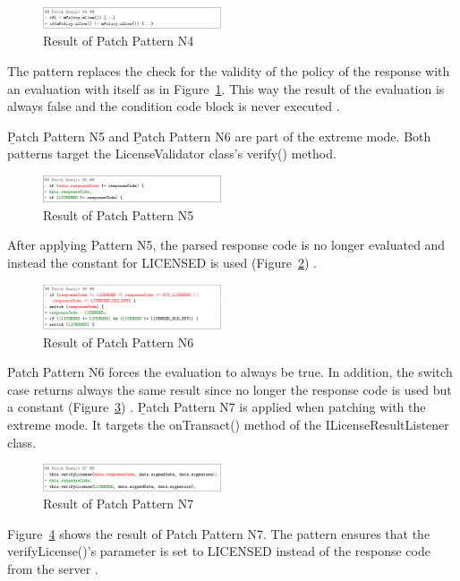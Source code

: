 \documentclass{sig-alternate}
\begin{document}
\begin{figure}[htbp]
  \centering
  \includegraphics[width=0.47\textwidth]{n4.png}
  \caption{Result of Patch Pattern N4 \cite{neutze}}
  \label{n4}
\end{figure}
The pattern replaces the check for the validity of the policy of the response with an evaluation with itself as in Figure~\ref{n4}.
This way the result of the evaluation is always false and the condition code block is never executed \cite{neutze}.

\b{Patch Pattern N5} and \b{Patch Pattern N6} are part of the extreme mode.
Both patterns target the LicenseValidator class's verify() method.
\begin{figure}[htbp]
  \centering
  \includegraphics[width=0.47\textwidth]{n5.png}
  \caption{Result of Patch Pattern N5 \cite{neutze}}
  \label{n5}
\end{figure}
After applying Pattern N5, the parsed response code is no longer evaluated and instead the constant for LICENSED is used (Figure~\ref{n5}) \cite{neutze}.
\begin{figure}[htbp]
  \centering
  \includegraphics[width=0.47\textwidth]{n6.png}
  \caption{Result of Patch Pattern N6 \cite{neutze}}
  \label{n6}
\end{figure}
Patch Pattern N6 forces the evaluation to always be true. In addition,  the switch case returns always the same result since no longer the response code is used but a constant (Figure~\ref{n6}) \cite{neutze}.
\b{Patch Pattern N7} is applied when patching with the extreme mode.
It targets the onTransact() method of the ILicenseResultListener class.
\begin{figure}[htbp]
  \centering
  \includegraphics[width=0.47\textwidth]{n7.png}
  \caption{Result of Patch Pattern N7 \cite{neutze}}
  \label{n7}
\end{figure}
Figure~\ref{n7} shows the result of Patch Pattern N7.
The pattern ensures that the verifyLicense()'s parameter is set to LICENSED instead of the response code from the server \cite{neutze}. \\
\end{document}
